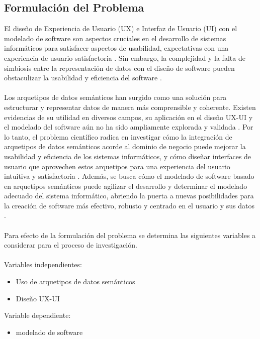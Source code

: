 \documentclass[12pt,a4paper]{article}
\begin{document}
\subsection{Formulación del Problema}
\label{sec:2}
El diseño de Experiencia de Usuario (UX) e Interfaz de Usuario (UI) con el modelado de software son aspectos cruciales en el desarrollo de sistemas informáticos para satisfacer aspectos de usabilidad, expectativas con una experiencia de usuario satisfactoria
\cite{Qanbari2016}
. Sin embargo, la complejidad y la falta de simbiosis entre la representación de datos con el diseño de software pueden obstaculizar la usabilidad y eficiencia del software
\cite{Qanbari2016}
. 
\\\\
Los arquetipos de datos semánticos han surgido como una solución para estructurar y representar datos de manera más comprensible y coherente. Existen evidencias de su utilidad en diversos campos, su aplicación en el diseño UX-UI y el modelado del software aún no ha sido ampliamente explorada y validada
\cite{Qanbari2016}
. Por lo tanto, el problema científico radica en investigar cómo la integración de arquetipos de datos semánticos acorde al dominio de negocio puede mejorar la usabilidad y eficiencia de los sistemas informáticos, y cómo diseñar interfaces de usuario que aprovechen estos arquetipos para una experiencia del usuario intuitiva y satisfactoria
\cite{Allones2013}
\cite{Alomari2020}
\cite{Hassan2016}
. Además, se busca cómo el modelado de software basado en arquetipos semánticos puede agilizar el desarrollo y determinar el modelado adecuado del sistema informático, abriendo la puerta a nuevas posibilidades para la creación de software más efectivo, robusto y centrado en el usuario y sus datos
\cite{Vaclav2017}
\cite{CardosodeMoraes2016}
\cite{Hassan2017}
.
\\\\
Para efecto de la formulación del problema se determina las siguientes variables a considerar para el proceso de investigación.
\\\\
Variables independientes: 
\begin{itemize}
  \item Uso de arquetipos de datos semánticos
  \item Diseño UX-UI
\end{itemize}
Variable dependiente:
\begin{itemize}
  \item modelado de software
\end{itemize}
\end{document}
